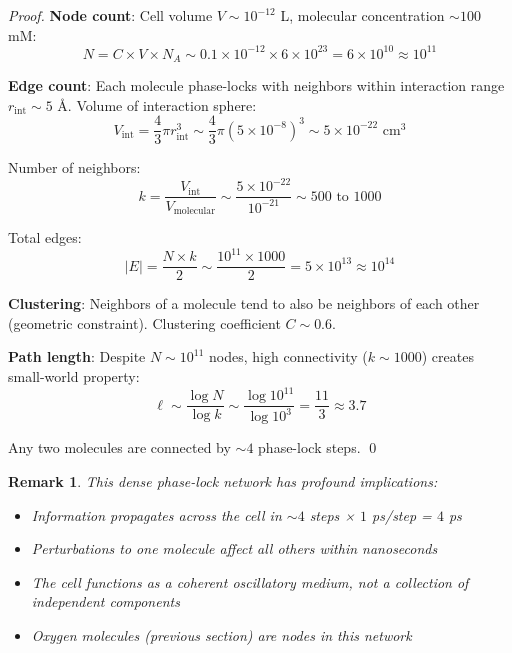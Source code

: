 \documentclass[12pt,a4paper]{article}
\newtheorem{remark}{Remark}
\begin{document}
\begin{proof}
\textbf{Node count}: Cell volume $V \sim 10^{-12}$ L, molecular concentration $\sim 100$ mM:
\begin{equation}
N = C \times V \times N_A \sim 0.1 \times 10^{-12} \times 6 \times 10^{23} = 6 \times 10^{10} \approx 10^{11}
\end{equation}

\textbf{Edge count}: Each molecule phase-locks with neighbors within interaction range $r_{\text{int}} \sim 5$ Å. Volume of interaction sphere:
\begin{equation}
V_{\text{int}} = \frac{4}{3} \pi r_{\text{int}}^3 \sim \frac{4}{3} \pi (5 \times 10^{-8})^3 \sim 5 \times 10^{-22} \text{ cm}^3
\end{equation}

Number of neighbors:
\begin{equation}
k = \frac{V_{\text{int}}}{V_{\text{molecular}}} \sim \frac{5 \times 10^{-22}}{10^{-21}} \sim 500 \text{ to } 1000
\end{equation}

Total edges:
\begin{equation}
|E| = \frac{N \times k}{2} \sim \frac{10^{11} \times 1000}{2} = 5 \times 10^{13} \approx 10^{14}
\end{equation}

\textbf{Clustering}: Neighbors of a molecule tend to also be neighbors of each other (geometric constraint). Clustering coefficient $C \sim 0.6$.

\textbf{Path length}: Despite $N \sim 10^{11}$ nodes, high connectivity ($k \sim 1000$) creates small-world property:
\begin{equation}
\ell \sim \frac{\log N}{\log k} \sim \frac{\log 10^{11}}{\log 10^3} = \frac{11}{3} \approx 3.7
\end{equation}

Any two molecules are connected by $\sim 4$ phase-lock steps. \qed
\end{proof}

\begin{remark}
This dense phase-lock network has profound implications:
\begin{itemize}
\item Information propagates across the cell in $\sim 4$ steps × $1$ ps/step = $4$ ps
\item Perturbations to one molecule affect all others within nanoseconds
\item The cell functions as a \textit{coherent oscillatory medium}, not a collection of independent components
\item Oxygen molecules (previous section) are nodes in this network
\end{itemize}
\end{remark}
\end{document}
